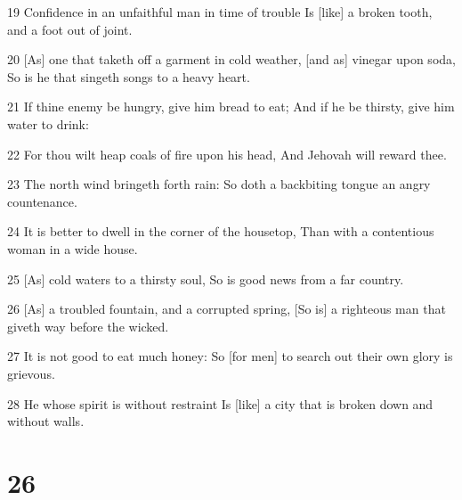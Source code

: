 \par 19 Confidence in an unfaithful man in time of trouble Is [like] a broken tooth, and a foot out of joint.
\par 20 [As] one that taketh off a garment in cold weather, [and as] vinegar upon soda, So is he that singeth songs to a heavy heart.
\par 21 If thine enemy be hungry, give him bread to eat; And if he be thirsty, give him water to drink:
\par 22 For thou wilt heap coals of fire upon his head, And Jehovah will reward thee.
\par 23 The north wind bringeth forth rain: So doth a backbiting tongue an angry countenance.
\par 24 It is better to dwell in the corner of the housetop, Than with a contentious woman in a wide house.
\par 25 [As] cold waters to a thirsty soul, So is good news from a far country.
\par 26 [As] a troubled fountain, and a corrupted spring, [So is] a righteous man that giveth way before the wicked.
\par 27 It is not good to eat much honey: So [for men] to search out their own glory is grievous.
\par 28 He whose spirit is without restraint Is [like] a city that is broken down and without walls.

\chapter{26}

